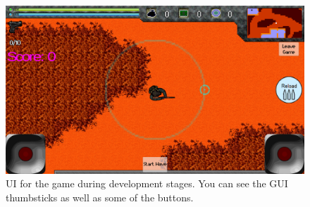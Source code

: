 \begin{figure}[H]
\centering
\includegraphics[width=.75\textwidth]{figures/controlscheme/ui}
\caption{UI for the game during development stages. You can see the GUI thumbsticks as well as some of the buttons.}
\label{sec:modules:controlscheme:touch:controls:ui}
\end{figure}